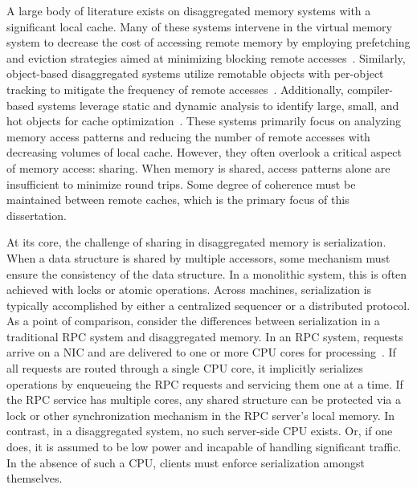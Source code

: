 \documentclass[12pt]{ucsddissertation}
\begin{document}
\begin{dissertationintroduction}
A large body of literature exists on disaggregated memory systems with a significant local cache.
Many of these systems intervene in the virtual memory system to decrease the cost of accessing
remote memory by employing prefetching and eviction strategies aimed at minimizing blocking remote
accesses~\cite{infiniswap,fastswap,leap,hydra}. Similarly, object-based disaggregated systems
utilize remotable objects with per-object tracking to mitigate the frequency of remote
accesses~\cite{aifm,carbink}. Additionally, compiler-based systems leverage static and dynamic
analysis to identify large, small, and hot objects for cache optimization~\cite{mira,trackfm}. These
systems primarily focus on analyzing memory access patterns and reducing the number of remote
accesses with decreasing volumes of local cache. However, they often overlook a critical aspect of
memory access: sharing. When memory is shared, access patterns alone are insufficient to minimize
round trips. Some degree of coherence must be maintained between remote caches, which is the primary
focus of this dissertation.




At its core, the challenge of sharing in disaggregated memory is serialization. When a data
structure is shared by multiple accessors, some mechanism must ensure the consistency of the data
structure. In a monolithic system, this is often achieved with locks or atomic operations. Across
machines, serialization is typically accomplished by either a centralized sequencer or a distributed
protocol. As a point of comparison, consider the differences between serialization in a traditional
RPC system and disaggregated memory. In an RPC system, requests arrive on a NIC and are delivered to
one or more CPU cores for processing~\cite{cuckoo-improvements,pilaf,herd,memc3,memcached}. If all
requests are routed through a single CPU core, it implicitly serializes operations by enqueueing the
RPC requests and servicing them one at a time. If the RPC service has multiple cores, any shared
structure can be protected via a lock or other synchronization mechanism in the RPC server's local
memory. In contrast, in a disaggregated system, no such server-side CPU exists. Or, if one does, it
is assumed to be low power and incapable of handling significant traffic. In the absence of such a
CPU, clients must enforce serialization amongst themselves.


\end{dissertationintroduction}
\end{document}
